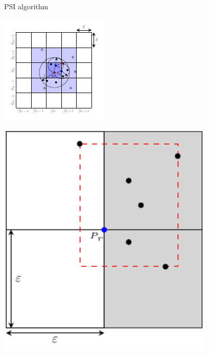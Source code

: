 \documentclass{beamer}
\begin{document}
    \begin{frame}{PSI algorithm}
        \begin{minipage}{0.5\textwidth}
            \centering
            \includegraphics[width=\textwidth]{../thesis/chapter4/figures/grid_prime}
        \end{minipage}\hfill %
        \begin{minipage}{0.5\textwidth}
            \vspace{6mm}
            \centering
            \includegraphics[width=0.78\textwidth]{../thesis/chapter4/figures/square}
        \end{minipage}
    \end{frame}
\end{document}
